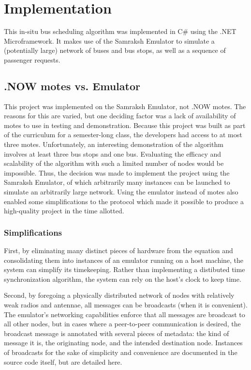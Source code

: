 \documentclass[runningheads]{llncs}
\begin{document}
\section{Implementation}
This in-situ bus scheduling algorithm was implemented in C\# using the .NET Microframework. It makes use of the Samraksh Emulator to simulate a (potentially large) network of buses and bus stops, as well as a sequence of passenger requests.

\subsection{.NOW motes vs. Emulator}
This project was implemented on the Samraksh Emulator, not .NOW motes. The reasons for this are varied, but one deciding factor was a lack of availability of motes to use in testing and demonstration. Because this project was built as part of the curriculum for a semester-long class, the developers had access to at most three motes. Unfortunately, an interesting demonstration of the algorithm involves at least three bus stops and one bus. Evaluating the efficacy and scalability of the algorithm with such a limited number of nodes would be impossible. Thus, the decision was made to implement the project using the Samraksh Emulator, of which arbitrarily many instances can be launched to simulate an arbitrarily large network. Using the emulator instead of motes also enabled some simplifications to the protocol which made it possible to produce a high-quality project in the time allotted.

\subsubsection{Simplifications}
First, by eliminating many distinct pieces of hardware from the equation and consolidating them into instances of an emulator running on a host machine, the system can simplify its timekeeping. Rather than implementing a distibuted time synchronization algorithm, the system can rely on the host's clock to keep time.

Second, by foregoing a physically distributed network of nodes with relatively weak radios and antennae, all messages can be broadcasts (when it is convenient). The emulator's networking capabilities enforce that all messages are broadcast to all other nodes, but in cases where a peer-to-peer communication is desired, the broadcast message is annotated with several pieces of metadata: the kind of message it is, the originating node, and the intended destination node. Instances of broadcasts for the sake of simplicity and convenience are documented in the source code itself, but are detailed here.
\end{document}
